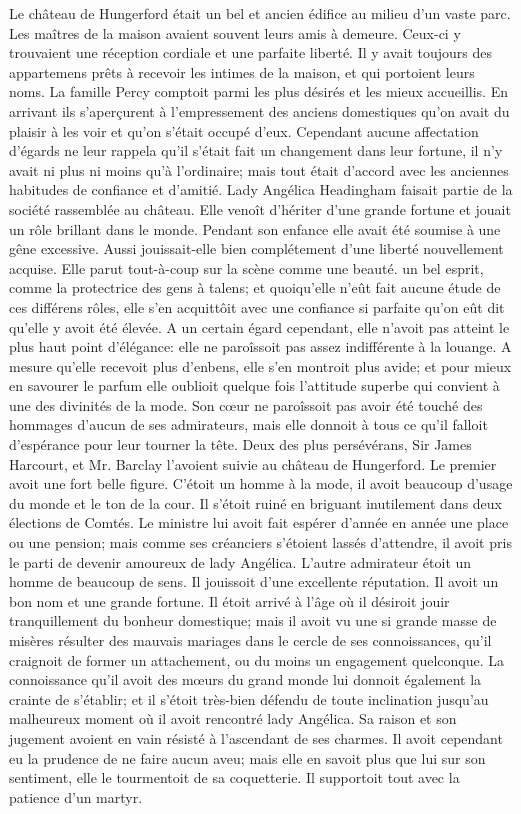 Le château de Hungerford était un bel et ancien édifice au milieu d'un vaste parc. Les maîtres de la maison avaient souvent leurs amis à demeure. Ceux-ci y trouvaient une réception cordiale et une parfaite liberté. Il y avait toujours des appartemens prêts à recevoir les intimes de la maison, et qui portoient leurs noms. La famille Percy comptoit parmi les plus désirés et les mieux accueillis.
En arrivant ils s'aperçurent à l'empressement des anciens domestiques qu'on avait du plaisir à les voir et qu'on s'était occupé d'eux. Cependant aucune affectation d'égards ne leur rappela qu'il s'était fait un changement dans leur fortune, il n'y avait ni plus ni moins qu'à l'ordinaire; mais tout était d'accord avec les anciennes habitudes de confiance et d'amitié.
Lady Angélica Headingham faisait partie de la société rassemblée au château. Elle venoît d'hériter d'une grande fortune et jouait un rôle brillant dans le monde. Pendant son enfance elle avait été soumise à une gêne excessive. Aussi jouissait-elle bien complétement d'une liberté nouvellement acquise. Elle parut tout-à-coup sur la scène comme une beauté.\setcounter{page}{528} un bel esprit, comme la protectrice des gens à talens; et quoiqu'elle n'eût fait aucune étude de ces différens rôles, elle s'en acquittôit avec une confiance si parfaite qu'on eût dit qu'elle y avoit été élevée.
A un certain égard cependant, elle n'avoit pas atteint le plus haut point d'élégance: elle ne paroîssoit pas assez indifférente à la louange. A mesure qu'elle recevoit plus d'enbens, elle s'en montroit plus avide; et pour mieux en savourer le parfum elle oublioit quelque fois l'attitude superbe qui convient à une des divinités de la mode.
Son cœur ne paroîssoit pas avoir été touché des hommages d'aucun de ses admirateurs, mais elle donnoit à tous ce qu'il falloit d'espérance pour leur tourner la tête. Deux des plus persévérans, Sir James Harcourt, et Mr. Barclay l'avoient suivie au château de Hungerford.
Le premier avoit une fort belle figure. C'étoit un homme à la mode, il avoit beaucoup d'usage du monde et le ton de la cour. Il s'étoit ruiné en briguant inutilement dans deux élections de Comtés. Le ministre lui avoit fait espérer d'année en année une place ou une pension; mais comme ses créanciers s'étoient lassés d'attendre, il avoit pris le parti de devenir amoureux de lady Angélica.\setcounter{page}{529} L'autre admirateur étoit un homme de beaucoup de sens. Il jouissoit d'une excellente réputation. Il avoit un bon nom et une grande fortune. Il étoit arrivé à l'âge où il désiroit jouir tranquillement du bonheur domestique; mais il avoit vu une si grande masse de misères résulter des mauvais mariages dans le cercle de ses connoissances, qu'il craignoit de former un attachement, ou du moins un engagement quelconque. La connoissance qu'il avoit des mœurs du grand monde lui donnoit également la crainte de s'établir; et il s'étoit très-bien défendu de toute inclination jusqu'au malheureux moment où il avoit rencontré lady Angélica. Sa raison et son jugement avoient en vain résisté à l'ascendant de ses charmes. Il avoit cependant eu la prudence de ne faire aucun aveu; mais elle en savoit plus que lui sur son sentiment, elle le tourmentoit de sa coquetterie. Il supportoit tout avec la patience d'un martyr.
